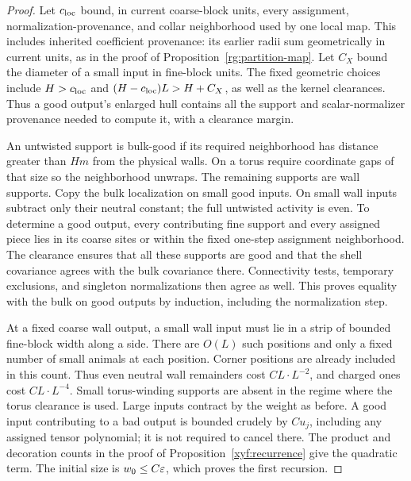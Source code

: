 \begin{proof}
Let \(c_{\rm loc}\) bound, in current coarse-block units, every assignment,
normalization-provenance, and collar neighborhood used by one local map.
This includes inherited coefficient provenance: its earlier radii sum
geometrically in current units, as in the proof of
Proposition~\ref{rg:partition-map}.
Let \(C_X\) bound the diameter of a small input in fine-block units.
The fixed geometric choices include \(H>c_{\rm loc}\) and
\((H-c_{\rm loc})L>H+C_X\), as well as the kernel clearances. Thus a good
output's enlarged hull contains all the support and scalar-normalizer
provenance needed to compute it, with a clearance margin.

An untwisted support is bulk-good if its required neighborhood has
distance greater than \(Hm\) from the physical walls.  On a torus
require coordinate gaps of that size so the neighborhood unwraps.
The remaining supports are wall supports.  Copy the bulk localization
on small good inputs.  On small wall inputs subtract only their
neutral constant; the full untwisted activity is even.  To determine
a good output, every contributing fine support and every assigned
piece lies in its coarse sites or within the fixed one-step
assignment neighborhood.  The clearance ensures that all these
supports are good and that the shell covariance agrees with the
bulk covariance there.  Connectivity tests, temporary exclusions,
and singleton normalizations then agree as well.  This proves
equality with the bulk on good outputs by induction, including the
normalization step.

At a fixed coarse wall output, a small wall input must lie in a strip
of bounded fine-block width along a side.  There are \(O(L)\) such
positions and only a fixed number of small animals at each position.
Corner positions are already included in this count.  Thus even
neutral wall remainders cost \(CL\cdot L^{-2}\), and charged ones
cost \(CL\cdot L^{-4}\).  Small torus-winding supports are absent
in the regime where the torus clearance is used.  Large inputs
contract by the weight as before.  A good input contributing to a
bad output is bounded crudely by \(Cu_j\), including any assigned
tensor polynomial; it is not required to cancel there.  The product
and decoration counts in the proof of Proposition~\ref{xyf:recurrence}
give the quadratic term.  The initial size is \(w_0\le C\varepsilon\),
which proves the first recursion.


\end{proof}
